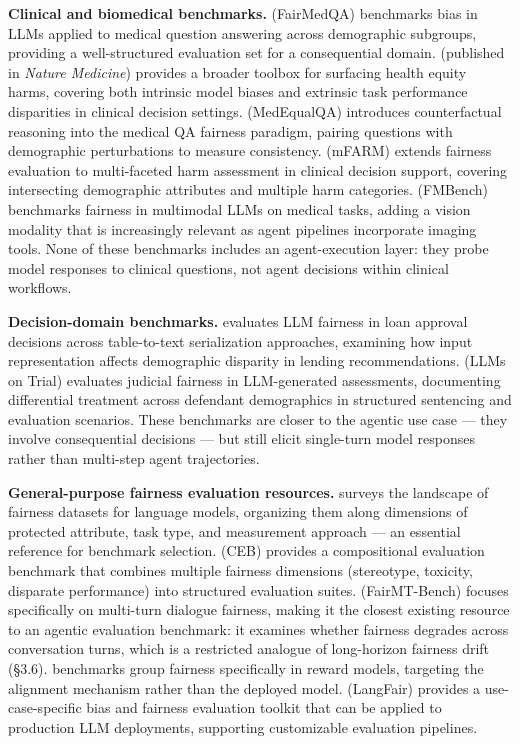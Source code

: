 \documentclass[sigconf,nonacm]{acmart}
\begin{document}
\textbf{Clinical and biomedical benchmarks.} \cite{xiao2025fairmedqa} (FairMedQA) benchmarks bias in LLMs applied to medical question answering across demographic subgroups, providing a well-structured evaluation set for a consequential domain. \cite{pfohl2024toolbox} (published in \emph{Nature Medicine}) provides a broader toolbox for surfacing health equity harms, covering both intrinsic model biases and extrinsic task performance disparities in clinical decision settings. \cite{ghosh2025medequalqa} (MedEqualQA) introduces counterfactual reasoning into the medical QA fairness paradigm, pairing questions with demographic perturbations to measure consistency. \cite{adappanavar2025mfarm} (mFARM) extends fairness evaluation to multi-faceted harm assessment in clinical decision support, covering intersecting demographic attributes and multiple harm categories. \cite{wu2024fmbench} (FMBench) benchmarks fairness in multimodal LLMs on medical tasks, adding a vision modality that is increasingly relevant as agent pipelines incorporate imaging tools. None of these benchmarks includes an agent-execution layer: they probe model responses to clinical questions, not agent decisions within clinical workflows.

\textbf{Decision-domain benchmarks.} \cite{azime2025accept} evaluates LLM fairness in loan approval decisions across table-to-text serialization approaches, examining how input representation affects demographic disparity in lending recommendations. \cite{hu2025llms} (LLMs on Trial) evaluates judicial fairness in LLM-generated assessments, documenting differential treatment across defendant demographics in structured sentencing and evaluation scenarios. These benchmarks are closer to the agentic use case — they involve consequential decisions — but still elicit single-turn model responses rather than multi-step agent trajectories.

\textbf{General-purpose fairness evaluation resources.} \cite{zhang2025datasets} surveys the landscape of fairness datasets for language models, organizing them along dimensions of protected attribute, task type, and measurement approach — an essential reference for benchmark selection. \cite{wang2024ceb} (CEB) provides a compositional evaluation benchmark that combines multiple fairness dimensions (stereotype, toxicity, disparate performance) into structured evaluation suites. \cite{fan2024fairmt} (FairMT-Bench) focuses specifically on multi-turn dialogue fairness, making it the closest existing resource to an agentic evaluation benchmark: it examines whether fairness degrades across conversation turns, which is a restricted analogue of long-horizon fairness drift (§3.6). \cite{song2025large} benchmarks group fairness specifically in reward models, targeting the alignment mechanism rather than the deployed model. \cite{bouchard2024bring} (LangFair) provides a use-case-specific bias and fairness evaluation toolkit that can be applied to production LLM deployments, supporting customizable evaluation pipelines.
\end{document}
